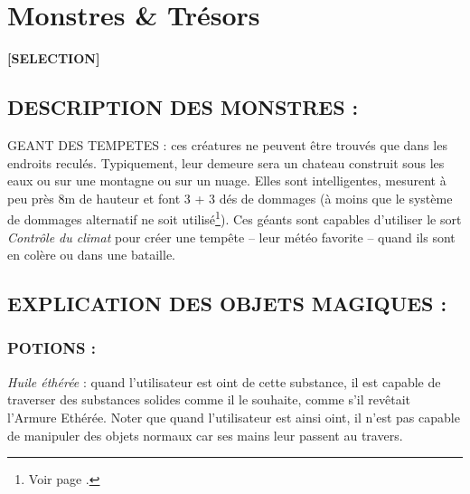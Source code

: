\newpage
{}\section*{Monstres \& Trésors}

\begin{center}
\textbf{[SELECTION]}
\end{center}

\subsection*{DESCRIPTION DES MONSTRES :}

\label{monstre-geant-des-tempetes}GEANT DES TEMPETES : ces créatures ne peuvent être trouvés que dans les endroits reculés. Typiquement, leur demeure sera un chateau construit sous les eaux ou sur une montagne ou sur un nuage. Elles sont intelligentes, mesurent à peu près 8m de hauteur et font 3 + 3 dés de dommages (à moins que le système de dommages alternatif ne soit utilisé\footnote{Voir page \pageref{greyhawk-dommages-monstres}.}). Ces géants sont capables d'utiliser le sort \textit{Contrôle du climat} pour créer une tempête -- leur météo favorite -- quand ils sont en colère ou dans une bataille.

\subsection*{EXPLICATION DES OBJETS MAGIQUES :}

\subsubsection*{POTIONS :}

\label{objet-huile-etheree}\textit{Huile éthérée} : quand l'utilisateur est oint de cette substance, il est capable de traverser des substances solides comme il le souhaite, comme s'il revêtait l'Armure Ethérée. Noter que quand l'utilisateur est ainsi oint, il n'est pas capable de manipuler des objets normaux car ses mains leur passent au travers.

